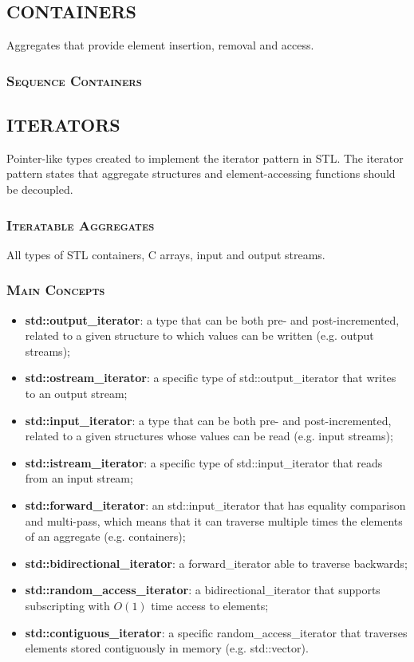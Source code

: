 \documentclass[10pt]{article}
\begin{document}
\scriptsize
\begin{multicols*}{5}
{\color{Brown}
\subsection*{CONTAINERS}	
Aggregates that provide element insertion, removal and access.

\subsubsection*{\textsc{Sequence Containers}} 
}

{\color{Blue}
\subsection*{ITERATORS}	
Pointer-like types created to implement the iterator pattern in STL. The iterator pattern states that aggregate structures and element-accessing functions should be decoupled.

\subsubsection*{\textsc{Iteratable Aggregates}} 
All types of STL containers, C arrays, input and output streams.

\subsubsection*{\textsc{Main Concepts}} 
\begin{itemize}[leftmargin=*,topsep=0.25pt]
  \setlength\itemsep{.3pt}
	\item \textbf{std::output\_iterator}: a type that can be both pre- and post-incremented, related to a given structure to which values can be written (e.g. output streams);
	\item \textbf{std::ostream\_iterator}: a specific type of std::out\-put\_i\-te\-ra\-tor that writes to an output stream;
	\item \textbf{std::input\_iterator}: a type that can be both pre- and post-incremented, related to a given structures whose values can be read (e.g. input streams);
	\item \textbf{std::istream\_iterator}: a specific type of std::in\-put\_i\-te\-ra\-tor that reads from an input stream;
	\item \textbf{std::forward\_iterator}: an std::input\_iterator that has equality comparison and multi-pass, which means that it can traverse multiple times the elements of an aggregate (e.g. containers); 
	\item \textbf{std::bidirectional\_iterator}: a forward\_iterator able to traverse backwards; 
	\item \textbf{std::random\_access\_iterator}: a bidirectional\_iterator that supports subscripting with $O(1)$ time access to elements; 
	\item \textbf{std::contiguous\_iterator}: a specific ran\-dom\_ac\-cess\_i\-te\-ra\-tor that traverses elements stored contiguously in memory (e.g. std::vector). 
\end{itemize}

}
\end{multicols*}
\end{document}
